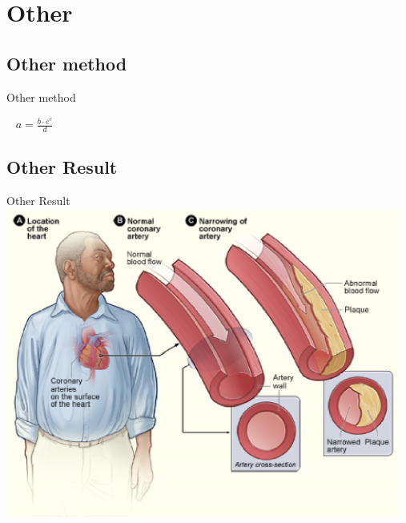 \documentclass{beamer}
\begin{document}
\section{Other}
\subsection{Other method}
\begin{frame}{Other method}
\begin{block}{~}
\centering
$a =
\frac{b\cdot e^c}{d}$
\end{block}
\end{frame}

\subsection{Other Result}
\begin{frame}{Other Result}
\centering
\includegraphics[width = 13cm]{im/chd1}
\end{frame}
\end{document}

